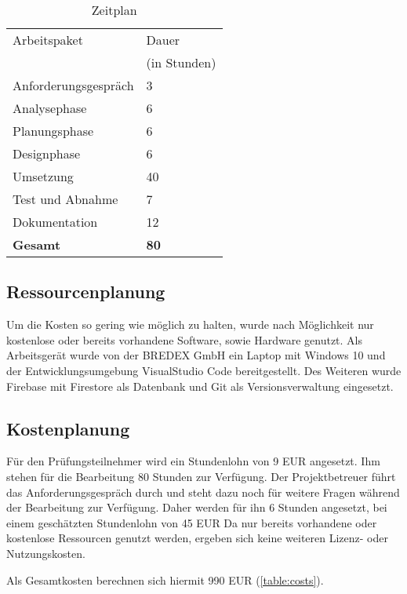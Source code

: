\documentclass[12pt]{article}
\begin{document}
\begin{table}[H]
    \centering
    \begin{tabular}{|l | l|}
        \hline
        Arbeitspaket & Dauer \\
        & (in Stunden) \\
        \hline
        Anforderungsgespräch & 3 \\
        Analysephase & 6 \\
        Planungsphase & 6 \\
        Designphase & 6 \\
        Umsetzung & 40 \\
        Test und Abnahme & 7 \\
        Dokumentation & 12 \\
        \hline
        \textbf{Gesamt} & \textbf{80} \\
        \hline
    \end{tabular}
    \caption{Zeitplan}
    \label{table:timeplan}
\end{table}

\subsection{Ressourcenplanung}
Um die Kosten so gering wie möglich zu halten, wurde nach Möglichkeit nur
kostenlose oder bereits vorhandene Software, sowie Hardware genutzt.
Als Arbeitsgerät wurde von der BREDEX GmbH ein Laptop mit Windows 10 und der
Entwicklungsumgebung VisualStudio Code bereitgestellt.
Des Weiteren wurde Firebase mit Firestore als Datenbank und Git als 
Versionsverwaltung eingesetzt.

\subsection{Kostenplanung}
Für den Prüfungsteilnehmer wird ein Stundenlohn von 9 EUR angesetzt.
Ihm stehen für die Bearbeitung 80 Stunden zur Verfügung.
Der Projektbetreuer führt das Anforderungsgespräch durch und steht 
dazu noch für weitere Fragen während der Bearbeitung zur Verfügung.
Daher werden für ihn 6 Stunden angesetzt, bei einem geschätzten 
Stundenlohn von 45 EUR
Da nur bereits vorhandene oder kostenlose Ressourcen genutzt werden,
ergeben sich keine weiteren Lizenz- oder Nutzungskosten.

Als Gesamtkosten berechnen sich hiermit 990 EUR (\autoref{table:costs}).
\end{document}
